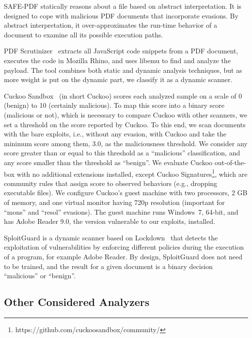 SAFE-PDF statically reasons about a file based on abstract interpretation. 
It is designed to cope with malicious PDF documents that incorporate evasions.
By abstract interpretation, it over-approximates the run-time behavior of a document to examine all its possible execution paths.

PDF Scrutinizer~\cite{schmitt2012pdf} extracts all JavaScript code snippets from a PDF document, executes the code in Mozilla Rhino, and uses libemu to find and analyze the payload.
The tool combines both static and dynamic analysis techniques, but as more weight is put on the dynamic part, we classify it as a dynamic scanner.

Cuckoo Sandbox~\cite{guarnieri2013cuckoo} (in short Cuckoo) scores each analyzed sample on a scale of 0 (benign) to 10 (certainly malicious).
To map this score into a binary score (malicious or not), which is necessary to compare Cuckoo with other scanners, we set a threshold on the score reported by Cuckoo.
To this end, we scan documents with the bare exploits, i.e., without any evasion, with Cuckoo and take the minimum score among them, 3.0, as the maliciousness threshold.
We consider any score greater than or equal to this threshold as a ``malicious'' classification, and any score smaller than the threshold as ``benign''.
We evaluate Cuckoo out-of-the-box with no additional extensions installed, except Cuckoo Signatures\footnote{https://github.com/cuckoosandbox/community/}, which are community rules that assign score to observed behaviors (e.g., dropping executable files).
We configure Cuckoo's guest machine with two processors, 2 GB of memory, and one virtual monitor having 720p resolution (important for ``mons'' and ``resol'' evasions).
The guest machine runs Windows~7, 64-bit, and has Adobe Reader 9.0, the version vulnerable to our exploits, installed.

SploitGuard is a dynamic scanner based on Lockdown~\cite{payer2015fine} that detects the exploitation of vulnerabilities by enforcing different policies during the execution of a program, for example Adobe Reader. By design, SploitGuard does not need to be trained, and the result for a given document is a binary decision ``malicious'' or ``benign''.



\subsection{Other Considered Analyzers}
\label{sec:other analyzers}


